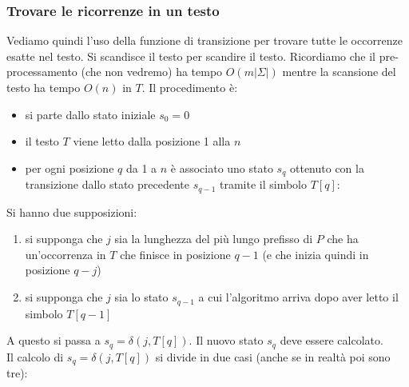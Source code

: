 \subsubsection{Trovare le ricorrenze in un testo}
Vediamo quindi l'uso della funzione di transizione per trovare tutte le
occorrenze esatte nel testo. Si scandisce il testo per scandire il
testo. Ricordiamo che il pre-processamento (che non vedremo) ha tempo
$O(m|\Sigma|)$ mentre la scansione del testo ha tempo $O(n)$ in $T$.
Il procedimento è:
\begin{itemize}
  \item si parte dallo stato iniziale $s_0=0$
  \item il testo $T$ viene letto dalla posizione 1 alla $n$
  \item per ogni posizione $q$ da 1 a $n$ è associato uno stato $s_q$ ottenuto
  con la transizione dallo stato precedente $s_{q-1}$ tramite il simbolo $T[q]$:
  
\end{itemize}
\begin{center}
  \end{center}
Si hanno due supposizioni:
\begin{enumerate}
  \item si supponga che $j$ sia la lunghezza del più lungo prefisso di $P$ che ha
  un’occorrenza in $T$ che finisce in posizione $q-1$ (e che inizia quindi in
  posizione $q-j$)
  \item si supponga che $j$ sia lo stato $s_{q-1}$ a cui l'algoritmo arriva dopo
  aver letto il simbolo $T[q-1]$
\end{enumerate}
A questo si passa a $s_q=\delta(j,T[q])$. Il nuovo stato $s_q$ deve essere
calcolato. \\
Il calcolo di $s_q=\delta(j, T[q])$ si divide in due casi (anche se in realtà
poi sono tre):
